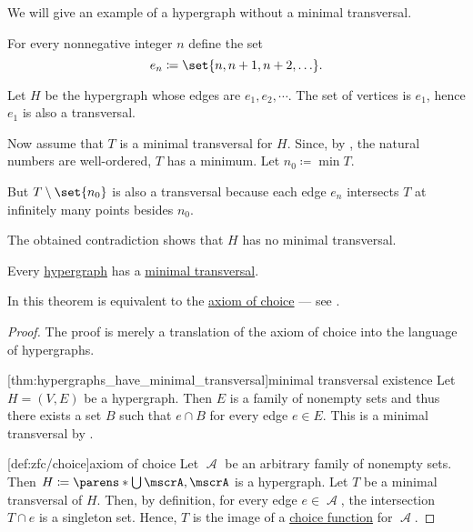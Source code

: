 \begin{example}\label{ex:hypergraph_with_no_minimal_transversal}
  We will give an example of a hypergraph without a minimal transversal.

  For every nonnegative integer \( n \) define the set
  \begin{equation*}
    e_n \coloneqq \set{ n, n + 1, n + 2, \ldots }.
  \end{equation*}

  Let \( H \) be the hypergraph whose edges are \( e_1, e_2, \cdots \). The set of vertices is \( e_1 \), hence \( e_1 \) is also a transversal.

  Now assume that \( T \) is a minimal transversal for \( H \). Since, by , the natural numbers are well-ordered, \( T \) has a minimum. Let \( n_0 \coloneqq \min T \).

  But \( T \setminus \set{ n_0 } \) is also a transversal because each edge \( e_n \) intersects \( T \) at infinitely many points besides \( n_0 \).

  The obtained contradiction shows that \( H \) has no minimal transversal.
\end{example}

\begin{theorem}\label{thm:hypergraphs_have_minimal_transversal}
  Every \hyperref[def:hypergraph]{hypergraph} has a \hyperref[def:hypergraph_minimal_transversal]{minimal transversal}.

  In \hyperref[def:zfc]{} this theorem is equivalent to the \hyperref[def:zfc/choice]{axiom of choice} --- see .
\end{theorem}
\begin{proof}
  The proof is merely a translation of the axiom of choice into the language of hypergraphs.

  [thm:hypergraphs_have_minimal_transversal]{minimal transversal existence} Let \( H = (V, E) \) be a hypergraph. Then \( E \) is a family of nonempty sets and thus there exists a set \( B \) such that \( e \cap B \) for every edge \( e \in E \). This is a minimal transversal by .

  [def:zfc/choice]{axiom of choice} Let \( \mscrA \) be an arbitrary family of nonempty sets. Then \( H \coloneqq \parens*{ \bigcup \mscrA, \mscrA } \) is a hypergraph. Let \( T \) be a minimal transversal of \( H \). Then, by definition, for every edge \( e \in \mscrA \), the intersection \( T \cap e \) is a singleton set. Hence, \( T \) is the image of a \hyperref[def:choice_function]{choice function} for \( \mscrA \).
\end{proof}
